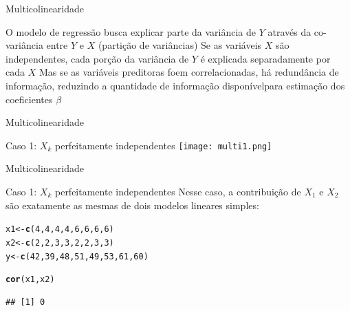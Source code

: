 \documentclass{beamer}\usepackage[]{graphicx}\usepackage[]{color}
\makeatletter
\newcommand{\hlnum}[1]{\textcolor[rgb]{0.686,0.059,0.569}{#1}}%
\newcommand{\hlstd}[1]{\textcolor[rgb]{0.345,0.345,0.345}{#1}}%
\newcommand{\hlkwb}[1]{\textcolor[rgb]{0.69,0.353,0.396}{#1}}%
\newcommand{\hlkwd}[1]{\textcolor[rgb]{0.737,0.353,0.396}{\textbf{#1}}}%
\newenvironment{kframe}{%
 \def\at@end@of@kframe{}%
 \ifinner\ifhmode%
  \def\at@end@of@kframe{\end{minipage}}%
  \begin{minipage}{\columnwidth}%
 \fi\fi%
 \def\FrameCommand##1{\hskip\@totalleftmargin \hskip-\fboxsep
 \colorbox{shadecolor}{##1}\hskip-\fboxsep
     \hskip-\linewidth \hskip-\@totalleftmargin \hskip\columnwidth}%
 \MakeFramed {\advance\hsize-\width
   \@totalleftmargin\z@ \linewidth\hsize
   \@setminipage}}%
 {\par\unskip\endMakeFramed%
 \at@end@of@kframe}
\newenvironment{knitrout}{}{} %
\renewenvironment{knitrout}{\setlength{\topsep}{0mm}}{}
\makeatother
\begin{document}
\begin{frame}{Multicolinearidade}

O modelo de regressão busca explicar parte da variância de $Y$ através da co-variância entre $Y$ e $X$ (partição de variâncias)
\vfill
Se as variáveis $X$ são independentes, cada porção da variância de $Y$ é explicada separadamente por cada $X$
\vfill
Mas se as variáveis preditoras foem correlacionadas, há redundância de informação, reduzindo a quantidade de informação disponívelpara estimação dos coeficientes $\beta$
\vfill


\end{frame}


\begin{frame}{Multicolinearidade}

Caso 1: $X_k$ perfeitamente independentes
\vfill
\texttt{[image: multi1.png]}


\end{frame}


\begin{frame}[fragile]{Multicolinearidade}

Caso 1: $X_k$ perfeitamente independentes
\vfill
Nesse caso, a contribuição de $X_1$ e $X_2$ são exatamente as mesmas de dois modelos lineares simples:
\vfill
\begin{knitrout}\tiny
{}\color{fgcolor}\begin{kframe}
\begin{alltt}
\hlstd{x1} \hlkwb{<-} \hlkwd{c}\hlstd{(}\hlnum{4}\hlstd{,}\hlnum{4}\hlstd{,}\hlnum{4}\hlstd{,}\hlnum{4}\hlstd{,}\hlnum{6}\hlstd{,}\hlnum{6}\hlstd{,}\hlnum{6}\hlstd{,}\hlnum{6}\hlstd{)}
\hlstd{x2} \hlkwb{<-} \hlkwd{c}\hlstd{(}\hlnum{2}\hlstd{,}\hlnum{2}\hlstd{,}\hlnum{3}\hlstd{,}\hlnum{3}\hlstd{,}\hlnum{2}\hlstd{,}\hlnum{2}\hlstd{,}\hlnum{3}\hlstd{,}\hlnum{3}\hlstd{)}
\hlstd{y} \hlkwb{<-} \hlkwd{c}\hlstd{(}\hlnum{42}\hlstd{,}\hlnum{39}\hlstd{,}\hlnum{48}\hlstd{,}\hlnum{51}\hlstd{,}\hlnum{49}\hlstd{,}\hlnum{53}\hlstd{,}\hlnum{61}\hlstd{,}\hlnum{60}\hlstd{)}

\hlkwd{cor}\hlstd{(x1,x2)}
\end{alltt}
\begin{verbatim}
## [1] 0
\end{verbatim}
\end{kframe}
\end{knitrout}

\end{frame}
\end{document}
